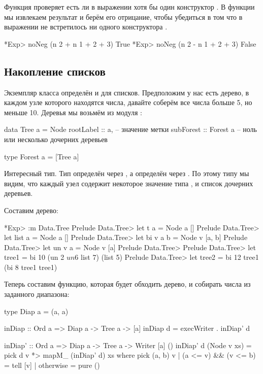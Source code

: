 Функция  проверяет есть ли в выражении 
хотя бы один конструктор . В функции 
мы извлекаем результат и берём его отрицание, чтобы
убедиться в том что в выражении не встретилось ни одного
конструктора . 

\begin{code}
*Exp> noNeg (n 2 + n 1 + 2 + 3)
True
*Exp> noNeg (n 2 - n 1 + 2 + 3)
False
\end{code}

\subsection{Накопление списков}

Экземпляр класса  определён и для списков.
Предположим у нас есть дерево, в каждом узле которого
находятся числа, давайте соберём все числа больше 5, но
меньше 10. Деревья мы возьмём из модуля :

\begin{code}
data Tree a   = Node {
		rootLabel :: a,		    -- значение метки
		subForest :: Forest a	-- ноль или несколько дочерних деревьев
	}

type Forest a = [Tree a]
\end{code}

Интересный тип. Тип  определён через , 
а  определён через . По этому типу мы видим,
что каждый узел содержит некоторое значение типа , 
и список дочерних деревьев. 

Составим дерево:

\begin{code}
*Exp> :m Data.Tree
Prelude Data.Tree> let t a = Node a []
Prelude Data.Tree> let list a = Node a []
Prelude Data.Tree> let bi v a b = Node v [a, b]
Prelude Data.Tree> let un v a   = Node v [a]
Prelude Data.Tree> 
Prelude Data.Tree> let tree1 = bi 10 (un 2 $ un 6 $ list 7) (list 5)
Prelude Data.Tree> let tree2 = bi 12 tree1 (bi 8 tree1 tree1)
\end{code}

Теперь составим функцию, которая будет обходить дерево,
и собирать числа из заданного диапазона:

\begin{code}
type Diap a = (a, a)

inDiap :: Ord a => Diap a -> Tree a -> [a]
inDiap d = execWriter . inDiap' d

inDiap' :: Ord a => Diap a -> Tree a -> Writer [a] ()
inDiap' d (Node v xs) = pick d v *> mapM_ (inDiap' d) xs 
    where pick (a, b) v
            | (a <= v) && (v <= b)  = tell [v]
            | otherwise             = pure ()
\end{code}

